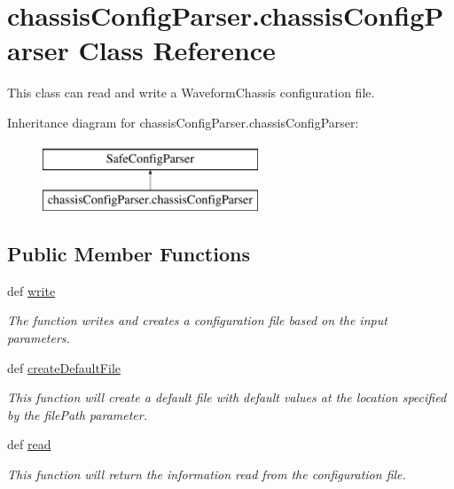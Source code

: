 \hypertarget{classchassis_config_parser_1_1chassis_config_parser}{\section{chassis\-Config\-Parser.\-chassis\-Config\-Parser Class Reference}
\label{classchassis_config_parser_1_1chassis_config_parser}
}


This class can read and write a Waveform\-Chassis configuration file.  


Inheritance diagram for chassis\-Config\-Parser.\-chassis\-Config\-Parser\-:\begin{figure}[H]
\begin{center}
\leavevmode
\includegraphics[height=2.000000cm]{classchassis_config_parser_1_1chassis_config_parser}
\end{center}
\end{figure}
\subsection*{Public Member Functions}
\begin{DoxyCompactItemize}
\item 
def \hyperlink{classchassis_config_parser_1_1chassis_config_parser_a1fdd2c5c9fbfc502390614248b193e40}{write}
\begin{DoxyCompactList}\small\item\em The function writes and creates a configuration file based on the input parameters. \end{DoxyCompactList}\item 
def \hyperlink{classchassis_config_parser_1_1chassis_config_parser_acc82f6735d3d5ba0df16c7c79fcb8a2a}{create\-Default\-File}
\begin{DoxyCompactList}\small\item\em This function will create a default file with default values at the location specified by the file\-Path parameter. \end{DoxyCompactList}\item 
def \hyperlink{classchassis_config_parser_1_1chassis_config_parser_a0248d8a624225ec74154dea93a9d2e64}{read}
\begin{DoxyCompactList}\small\item\em This function will return the information read from the configuration file. \end{DoxyCompactList}\end{DoxyCompactItemize}


